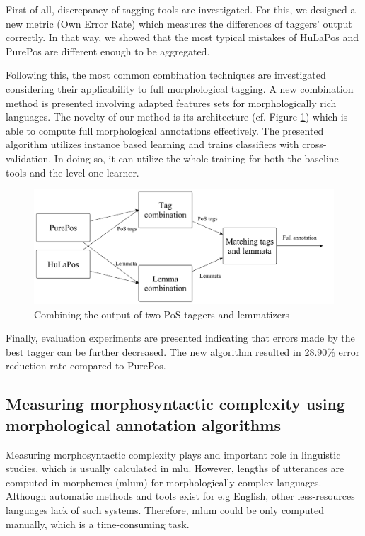 First of all, discrepancy of tagging tools are investigated. 
For this, we designed a new metric (Own Error Rate) which measures the differences of taggers' output correctly.
In that way, we showed that the most typical mistakes of HuLaPos and PurePos are different enough to be aggregated.

Following this, the most common combination techniques are investigated considering their applicability to full morphological tagging.
A new combination method is presented involving adapted features sets for morphologically rich languages.
The novelty of our method is its architecture (cf. Figure \ref{fig:comb3_en}) which is able to compute full morphological annotations effectively.
The presented algorithm utilizes instance based learning \cite{Aha1991} and trains classifiers with cross-validation.
In doing so, it can utilize the whole training for both the baseline tools and the level-one learner.

\begin{figure}[H]
  \centering
  \includegraphics[scale=0.17]{MorphTagging/comb3.png} 
  \caption{Combining the output of two PoS taggers and lemmatizers}
  \label{fig:comb3_en}
\end{figure}


Finally, evaluation experiments are presented indicating that errors made by the best tagger can be further decreased.
The new algorithm resulted in 28.90\% error reduction rate compared to PurePos.

\subsection{Measuring morphosyntactic complexity using morphological annotation algorithms}
\label{thes:mlu}

Measuring morphosyntactic complexity plays and important role in linguistic studies, which is usually calculated in \acrlong{mlu}.
However, lengths of utterances are computed in morphemes (\acrshort{mlum}) for morphologically complex languages.
Although automatic methods and tools exist for e.g English, other less-resources languages lack of such systems.
Therefore, \acrshort{mlum} could be only computed manually, which is a time-consuming task.

